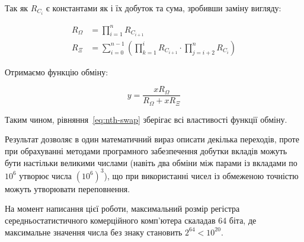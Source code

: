 \documentclass[../index.tex]{subfiles}
\begin{document}
Так як $R_{C_{i}}$ є константами як і їх добуток та сума, зробивши заміну вигляду:

\begin{equation}\label{eq:swap-omega-xi}
\begin{aligned}
  R_{\Omega} &= \prod_{i=1}^n R_{C_{i+1}} \\
  R_{\Xi} &= \sum_{i=0}^{n-1} \left( \prod_{k=1}^i R_{C_{i+1}} \cdot \prod_{j=i+2}^{n}  R_{C_{i}} \right)
\end{aligned}
\end{equation}

Отримаємо функцію обміну:

\begin{equation*}
y = \frac{x R_{\Omega}}{R_{\Omega} + x R_{\Xi}}
\end{equation*}

Таким чином, рівняння~\eqref{eq:nth-swap} зберігає всі властивості функції
обміну.

Результат дозволяє в один математичний вираз описати декілька переходів, проте
при обрахуванні методами програмного забезпечення добутки вкладів можуть бути
настільки великими числами (навіть два обміни між парами із вкладами по \(10^6\)
утворює числа \({(10^6)}^3\)), що при використанні чисел із обмеженою точністю
можуть утворювати переповнення.

На момент написання цієї роботи, максимальний розмір регістра
середньостатистичного комерційного комп'ютера скаладав 64 біта, де максимальне
значення числа без знаку становить \(2^{64} < 10^{20}\).
\end{document}
